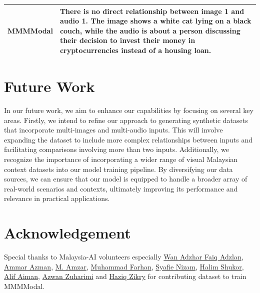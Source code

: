 \documentclass[preprint]{article}
\begin{document}
\begin{table}[hbt!]
\begin{tabular}{>{\arraybackslash}m{6.5cm}>{\arraybackslash}m{6.5cm}}
    MMMModal                                           & There is no direct relationship between image 1 and audio 1. The image shows a white cat lying on a black couch, while the audio is about a person discussing their decision to invest their money in cryptocurrencies instead of a housing loan.                                                                                                                                                                                                                                                                                                                                                                                                                                    \\
    \hline
  \end{tabular}
\end{table}

\clearpage

\section{Future Work}

In our future work, we aim to enhance our capabilities by focusing on several key areas. Firstly, we intend to refine our approach to generating synthetic datasets that incorporate multi-images and multi-audio inputs. This will involve expanding the dataset to include more complex relationships between inputs and facilitating comparisons involving more than two inputs. Additionally, we recognize the importance of incorporating a wider range of visual Malaysian context datasets into our model training pipeline. By diversifying our data sources, we can ensure that our model is equipped to handle a broader array of real-world scenarios and contexts, ultimately improving its performance and relevance in practical applications.

\section{Acknowledgement}

Special thanks to Malaysia-AI volunteers especially \href{https://www.linkedin.com/in/wan-adzhar-faiq-adzlan-19a27baa/}{Wan Adzhar Faiq Adzlan}, \href{https://www.linkedin.com/in/ammar-azman/}{Ammar Azman}, \href{https://www.linkedin.com/in/amzar96/}{M. Amzar}, \href{https://www.linkedin.com/in/muhammad-farhan-helmy-0529501a7/}{Muhammad Farhan}, \href{https://www.linkedin.com/in/syafie-nizam/}{Syafie Nizam}, \href{https://www.linkedin.com/in/halimshukor/}{Halim Shukor}, \href{https://www.linkedin.com/in/alif-aiman-1b334b24b/}{Alif Aiman}, \href{https://www.linkedin.com/in/azwan-zuharimi/}{Azwan Zuharimi} and \href{https://www.linkedin.com/in/haziqzikry/}{Haziq Zikry} for contributing dataset to train MMMModal.
\end{document}
